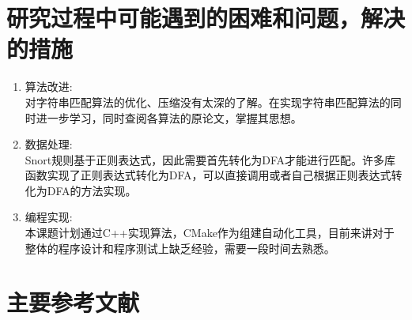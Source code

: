 \section{研究过程中可能遇到的困难和问题，解决的措施}
\begin{enumerate}
  \item 算法改进:\\对字符串匹配算法的优化、压缩没有太深的了解。在实现字符串匹配算法的同时进一步学习，同时查阅各算法的原论文，掌握其思想。
  \item 数据处理:\\Snort规则基于正则表达式，因此需要首先转化为DFA才能进行匹配。许多库函数实现了正则表达式转化为DFA，可以直接调用或者自己根据正则表达式转化为DFA的方法\cite{张树壮2011面向网络安全的正则表达式匹配技术}实现。
  \item 编程实现:\\本课题计划通过C++实现算法，CMake作为组建自动化工具，目前来讲对于整体的程序设计和程序测试上缺乏经验，需要一段时间去熟悉。
\end{enumerate}

\vspace{8mm}
\section{主要参考文献}



